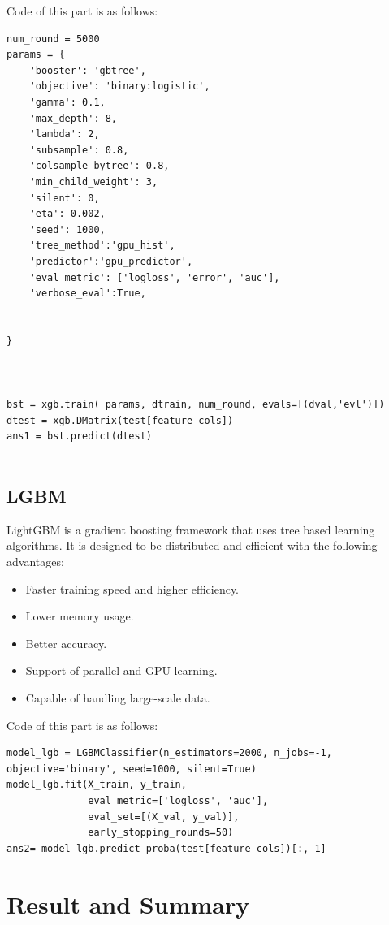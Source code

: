 \documentclass[sigconf]{acmart}
\begin{document}
Code of this part is as follows:

\begin{lstlisting}
num_round = 5000
params = {
    'booster': 'gbtree',
    'objective': 'binary:logistic',  
    'gamma': 0.1,                 
    'max_depth': 8,               
    'lambda': 2,                   
    'subsample': 0.8,              
    'colsample_bytree': 0.8,       
    'min_child_weight': 3,
    'silent': 0,                   
    'eta': 0.002,                  
    'seed': 1000,
    'tree_method':'gpu_hist',
    'predictor':'gpu_predictor',
    'eval_metric': ['logloss', 'error', 'auc'],
    'verbose_eval':True,
    
    
}



bst = xgb.train( params, dtrain, num_round, evals=[(dval,'evl')])
dtest = xgb.DMatrix(test[feature_cols])
ans1 = bst.predict(dtest)


\end{lstlisting}

\subsection{LGBM}

LightGBM is a gradient boosting framework that uses tree based learning algorithms. It is designed to be distributed and efficient with the following advantages:

\begin{itemize}
\item Faster training speed and higher efficiency.
\item Lower memory usage.
\item Better accuracy.
\item Support of parallel and GPU learning.
\item Capable of handling large-scale data.

\end{itemize}

Code of this part is as follows:
\begin{lstlisting}
model_lgb = LGBMClassifier(n_estimators=2000, n_jobs=-1, objective='binary', seed=1000, silent=True)
model_lgb.fit(X_train, y_train,
              eval_metric=['logloss', 'auc'],
              eval_set=[(X_val, y_val)],
              early_stopping_rounds=50)
ans2= model_lgb.predict_proba(test[feature_cols])[:, 1]
\end{lstlisting}

\section{Result and Summary}
\end{document}
